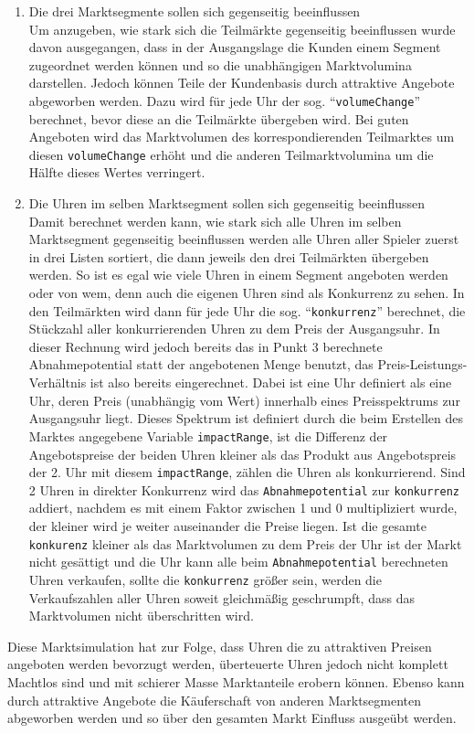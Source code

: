 \begin{enumerate}
\item Die drei Marktsegmente sollen sich gegenseitig beeinflussen
	\\ Um anzugeben, wie stark sich die Teilmärkte gegenseitig beeinflussen wurde davon ausgegangen, dass in der Ausgangslage die Kunden einem Segment zugeordnet werden können und so die unabhängigen Marktvolumina darstellen. Jedoch können Teile der Kundenbasis durch attraktive Angebote abgeworben werden. Dazu wird für jede Uhr der sog. \enquote{\texttt{volumeChange}} berechnet, bevor diese an die Teilmärkte übergeben wird. Bei guten Angeboten wird das Marktvolumen des korrespondierenden Teilmarktes um diesen \texttt{volumeChange} erhöht und die anderen Teilmarktvolumina um die Hälfte dieses Wertes verringert.
\item Die Uhren im selben Marktsegment sollen sich gegenseitig beeinflussen
	\\ Damit berechnet werden kann, wie stark sich alle Uhren im selben Marktsegment gegenseitig beeinflussen werden alle Uhren aller Spieler zuerst in drei Listen sortiert, die dann jeweils den drei Teilmärkten übergeben werden. So ist es egal wie viele Uhren in einem Segment angeboten werden oder von wem, denn auch die eigenen Uhren sind als Konkurrenz zu sehen. In den Teilmärkten wird dann für jede Uhr die sog. \enquote{\texttt{konkurrenz}} berechnet, die Stückzahl aller konkurrierenden Uhren zu dem Preis der Ausgangsuhr. In dieser Rechnung wird jedoch bereits das in Punkt 3 berechnete Abnahmepotential statt der angebotenen Menge benutzt, das Preis-Leistungs-Verhältnis ist also bereits eingerechnet. Dabei ist eine Uhr definiert als eine Uhr, deren Preis (unabhängig vom Wert) innerhalb eines Preisspektrums zur Ausgangsuhr liegt. Dieses Spektrum ist definiert durch die beim Erstellen des Marktes angegebene Variable \texttt{impactRange}, ist die Differenz der Angebotspreise der beiden Uhren kleiner als das Produkt aus Angebotspreis der 2. Uhr mit diesem \texttt{impactRange}, zählen die Uhren als konkurrierend. Sind 2 Uhren in direkter Konkurrenz wird das \texttt{Abnahmepotential} zur \texttt{konkurrenz} addiert, nachdem es mit einem Faktor zwischen 1 und 0 multipliziert wurde, der kleiner wird je weiter auseinander die Preise liegen. Ist die gesamte \texttt{konkurenz} kleiner als das Marktvolumen zu dem Preis der Uhr ist der Markt nicht gesättigt und die Uhr kann alle beim \texttt{Abnahmepotential} berechneten Uhren verkaufen, sollte die \texttt{konkurrenz} größer sein, werden die Verkaufszahlen aller Uhren soweit gleichmäßig geschrumpft, dass das Marktvolumen nicht überschritten wird.
\end{enumerate}
Diese Marktsimulation hat zur Folge, dass Uhren die zu attraktiven Preisen angeboten werden bevorzugt werden, überteuerte Uhren jedoch nicht komplett Machtlos sind und mit schierer Masse Marktanteile erobern können. Ebenso kann durch attraktive Angebote die Käuferschaft von anderen Marktsegmenten abgeworben werden und so über den gesamten Markt Einfluss ausgeübt werden.
